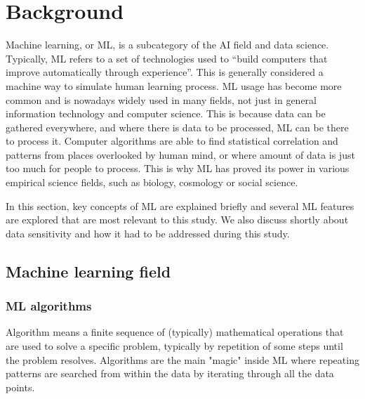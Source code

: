 
\section{Background}\label{sec:background}

Machine learning, or ML,
is a subcategory of the AI field and data science.
Typically, ML refers to
a set of technologies used to \enquote{build computers
that improve automatically through experience}.\cite{jordan2015machine}
This is generally considered a machine way
to simulate human learning process.
ML usage has become more common
and is nowadays widely used in many fields,
not just in general information technology and computer science.
This is because data can be gathered everywhere,
and where there is data to be processed,
ML can be there to process it.
Computer algorithms are able to find 
statistical correlation and patterns
from places overlooked by human mind,
or where amount of data is just too much 
for people to process.
This is why ML has proved its power
in various empirical science fields,
such as biology, cosmology or social science.\cite{jordan2015machine}

In this section, 
key concepts of ML are explained briefly
and several ML features are explored 
that are most relevant to this study.
We also discuss shortly about data sensitivity
and how it had to be addressed during this study.



\subsection{Machine learning field}\label{subsec:bg-ml-field}

\subsubsection*{ML algorithms}
Algorithm means a finite sequence of (typically) mathematical operations
that are used to solve a specific problem, 
typically by repetition of some steps
until the problem resolves.\cite{merriam2022algorithm}
Algorithms are the main "magic" inside ML
where repeating patterns are searched from within the data
by iterating through all the data points.

